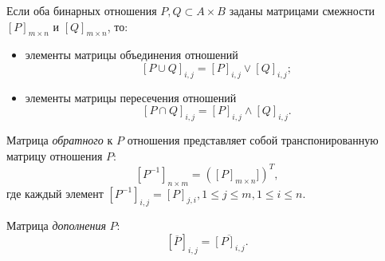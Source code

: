Если оба бинарных отношения $P,Q\subset A\times B$ заданы матрицами смежности $[P]_{m\times n}$ и $[Q]_{m\times n}$, то:
\begin{itemize}
    \item элементы матрицы объединения отношений
    \[
        [P\cup Q]_{i,j}=[P]_{i,j}\lor [Q]_{i,j};
    \]
    
    \item элементы матрицы пересечения отношений
    \[
        [P\cap Q]_{i,j}=[P]_{i,j}\land [Q]_{i,j}.
    \]
\end{itemize}

Матрица \emph{обратного} к $P$ отношения представляет собой транспонированную матрицу отношения $P$:
\[
    [P^{-1}]_{n\times m}=([P]_{m\times n}])^{T}, 
\]
где каждый элемент $[P^{-1}]_{i,j}=[P]_{j,i}, 1\leq j\leq m, 1\leq i\leq n.$

Матрица \emph{дополнения} $P$:
\[
    [\overline{P}]_{i,j}=\overline{ [P]_{i,j} }.
\]

